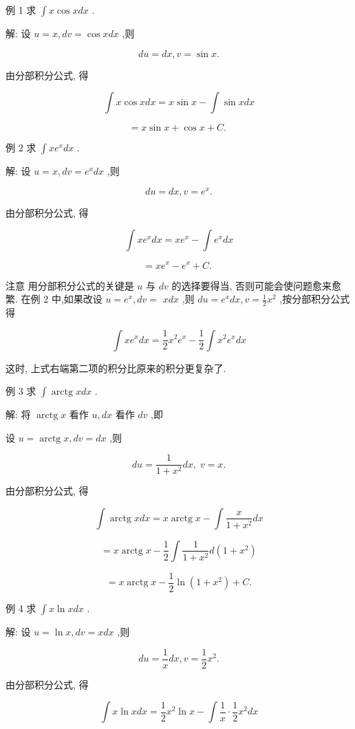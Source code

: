 \documentclass[lang=cn,newtx,12pt,scheme=chinese]{elegantbook}
\begin{document}
例 1 求 \(\int x\cos {xdx}\) .

解: 设 \(u = x,{dv} = \cos {xdx}\) ,则

\[
{du} = {dx},v = \sin x.
\]

由分部积分公式, 得

\[
\int x\cos {xdx} = x\sin x - \int \sin {xdx}
\]

\[
= x\sin x + \cos x + C\text{. }
\]

例 2 求 \(\int x{e}^{x}{dx}\) .

解: 设 \(u = x,{dv} = {e}^{x}{dx}\) ,则

\[
{du} = {dx},v = {e}^{x}.
\]

由分部积分公式, 得

\[
\int x{e}^{x}{dx} = x{e}^{x} - \int {e}^{x}{dx}
\]

\[
= x{e}^{x} - {e}^{x} + C\text{. }
\]

注意 用分部积分公式的关键是 \(u\) 与 \({dv}\) 的选择要得当, 否则可能会使问题愈来愈繁. 在例 2 中,如果改设 \(u = {e}^{x},{dv} =\) \({xdx}\) ,则 \({du} = {e}^{x}{dx},v = \frac{1}{2}{x}^{2}\) ,按分部积分公式得

\[
\int x{e}^{x}{dx} = \frac{1}{2}{x}^{2}{e}^{x} - \frac{1}{2}\int {x}^{2}{e}^{x}{dx}
\]

这时, 上式右端第二项的积分比原来的积分更复杂了.

例 3 求 \(\int \operatorname{arctg}{xdx}\) .

解: 将 \(\operatorname{arctg}x\) 看作 \(u,{dx}\) 看作 \({dv}\) ,即

设 \(u = \operatorname{arctg}x,{dv} = {dx}\) ,则

\[
{du} = \frac{1}{1 + {x}^{2}}{dx},\;v = x.
\]

由分部积分公式, 得

\[
\int \operatorname{arctg}{xdx} = x\operatorname{arctg}x - \int \frac{x}{1 + {x}^{2}}{dx}
\]

\[
= x\operatorname{arctg}x - \frac{1}{2}\int \frac{1}{1 + {x}^{2}}d\left( {1 + {x}^{2}}\right)
\]

\[
= x\operatorname{arctg}x - \frac{1}{2}\ln \left( {1 + {x}^{2}}\right) + C\text{.}
\]

例 4 求 \(\int x\ln {xdx}\) .

解: 设 \(u = \ln x,{dv} = {xdx}\) ,则

\[
{du} = \frac{1}{x}{dx},v = \frac{1}{2}{x}^{2}.
\]

由分部积分公式, 得

\[
\int x\ln {xdx} = \frac{1}{2}{x}^{2}\ln x - \int \frac{1}{x} \cdot \frac{1}{2}{x}^{2}{dx}
\]
\end{document}
